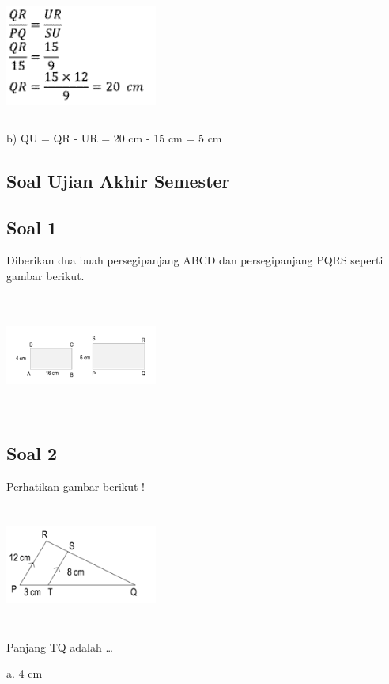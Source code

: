 \documentclass[11pt,fleqn]{book} %
\begin{document}
\includegraphics[width = 5cm, height= 4cm]{Pictures/a37.png}

b) QU = QR - UR = 20 cm - 15 cm = 5 cm

\subsection{Soal Ujian Akhir Semester}

\subsection{Soal 1}

Diberikan dua buah persegipanjang ABCD dan persegipanjang PQRS seperti gambar berikut.

\includegraphics[width = 5cm, height= 4cm]{Pictures/a38.png}

\subsection{Soal 2}

Perhatikan gambar berikut ! 

\includegraphics[width = 5cm, height= 4cm]{Pictures/a39.png}
 
Panjang TQ adalah …

a. 4 cm 
\end{document}
